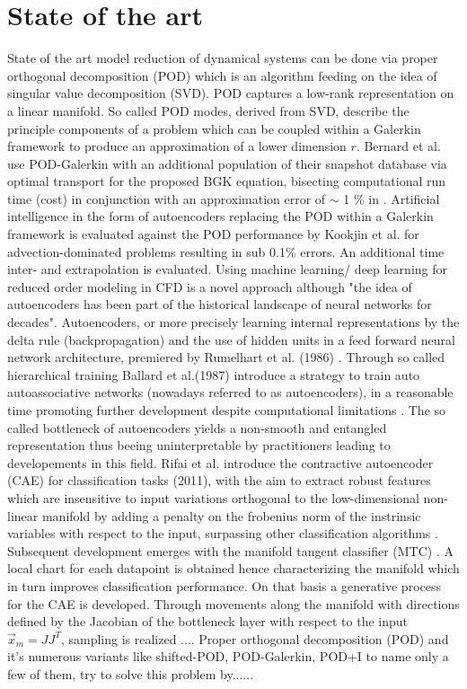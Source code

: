 \section{State of the art}
State of the art model reduction of dynamical systems can be done via proper orthogonal decomposition (POD) which is an algorithm feeding on the idea of singular value decomposition (SVD)\cite{Franz}\cite{Kutz}. POD captures a low-rank representation on a linear manifold. So called POD modes, derived from SVD, describe the principle components of a problem which can be coupled within a Galerkin framework to produce an approximation of a lower dimension \(r\). 
Bernard et al. use POD-Galerkin with an additional population of their snapshot database via optimal transport for the proposed BGK equation, bisecting computational run time (cost) in conjunction with an approximation error of \(\sim\) 1 \% in \cite{Bernard}. Artificial intelligence in the form of autoencoders replacing the POD within a Galerkin framework is evaluated against the POD performance by Kookjin et al. for advection-dominated problems\cite{Carlberg} resulting in sub 0.1\% errors. An additional time inter- and extrapolation is evaluated. Using machine learning/ deep learning for reduced order modeling in CFD is a novel approach although "the idea of autoencoders has been part of the historical landscape of neural networks for decades"\cite[p.493]{Goodfellow}. Autoencoders, or more precisely learning internal representations by the delta rule (backpropagation) and the use of hidden units in a feed forward neural network architecture, premiered by Rumelhart et al. (1986) \cite{Rumelhart}.  Through so called hierarchical training Ballard et al.(1987) introduce a strategy to train auto autoassociative networks (nowadays referred to as autoencoders), in a reasonable time promoting further development despite computational limitations \cite{Ballard}. The so called bottleneck of autoencoders yields a non-smooth and entangled representation thus beeing uninterpretable by practitioners\cite{Rifai2011} leading to developements in this field. Rifai et al. introduce the contractive autoencoder (CAE) for classification tasks (2011), with the aim to extract robust features which are insensitive to input variations orthogonal to the low-dimensional non-linear manifold by adding a penalty on the frobenius norm of the instrinsic variables with respect to the input, surpassing other classification algorithms \cite{Rifai2011}. Subsequent development emerges with the manifold tangent classifier (MTC) \cite{Rifai_2011a}. A local chart for each datapoint is obtained hence characterizing the manifold  which in turn improves classification performance. On that basis a generative process for the CAE is developed. Through movements along the manifold with directions defined by the Jacobian of the bottleneck layer with respect to the input \begin{math}	\vec{x}_m=JJ^T \end{math}, sampling is realized \cite{rifai2012generative}....
Proper orthogonal decomposition (POD) and it's numerous variants like shifted-POD\cite{bibid}, POD-Galerkin\cite{bibid}, POD+I \cite{bibid} to name only a few of them, try to solve this problem by......	